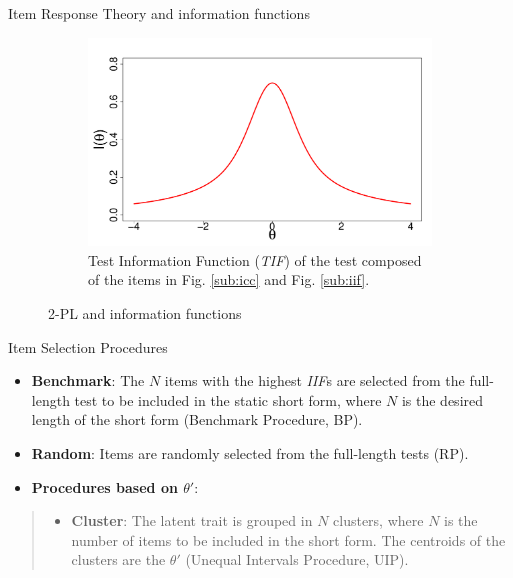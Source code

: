 \documentclass[final,t]{beamer}
\begin{document}
\begin{frame}
\begin{columns}[t]
\begin{column}{.45\linewidth}
\begin{block}{\centering Item Response Theory and information functions}
\begin{figure}
		\begin{subfigure}{.45\linewidth}
			\includegraphics[width=\linewidth]{img/tif.pdf}
			\caption{Test Information Function (\emph{TIF}) of the test composed of the items in Fig. \ref{sub:icc} and Fig. \ref{sub:iif}.}
			\label{sub:tif}
		\end{subfigure}
		\caption{2-PL and information functions}
	\end{figure}
\end{block}
			
		
				

				
				\begin{block}{\centering Item Selection Procedures}
					 \begin{itemize}
					 	\item \textbf{Benchmark}: The $N$ items with the highest \emph{IIF}s are selected from the full-length test to be included in the static short form, where $N$ is the desired length of the short form (Benchmark Procedure, BP).
					 
					 	\item \textbf{Random}: Items are randomly selected from the full-length tests (RP).
					 	
					 	\item \textbf{Procedures based on $\theta'$}:
					 \end{itemize}
					 	\begin{quote}
					 		\begin{itemize}
					 			
					 			\item \textbf{Cluster}: The latent trait is grouped in $N$ clusters, where $N$ is the number of items to be included in the short form. The centroids of the clusters are the $\theta'$ (Unequal Intervals Procedure, UIP).
					 			

\end{itemize}
\end{quote}
\end{block}
\end{column}
\end{columns}
\end{frame}
\end{document}
